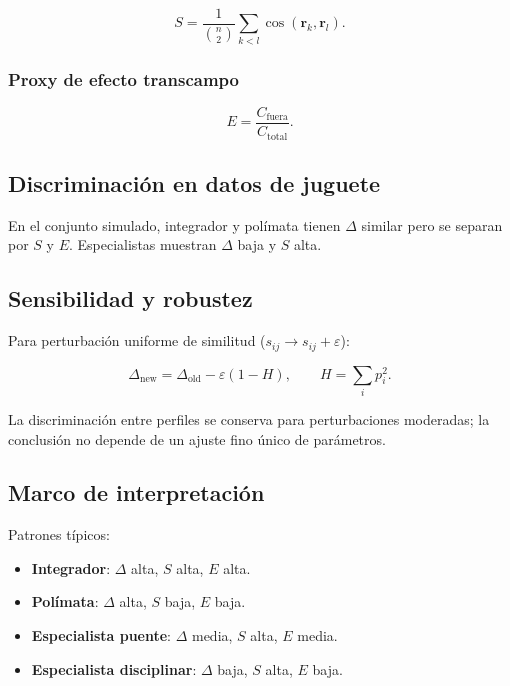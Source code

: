 \documentclass[
]{article}
\providecommand{\tightlist}{%
  \setlength{\itemsep}{0pt}\setlength{\parskip}{0pt}}
\begin{document}
\[S = \frac{1}{\binom{n}{2}}\sum_{k<l}\cos(\mathbf r_k,\mathbf r_l).\]

\hypertarget{proxy-de-efecto-transcampo}{%
\subsubsection{Proxy de efecto
transcampo}\label{proxy-de-efecto-transcampo}}

\[E = \frac{C_{\text{fuera}}}{C_{\text{total}}}.\]

\hypertarget{discriminaciuxf3n-en-datos-de-juguete}{%
\subsection{Discriminación en datos de
juguete}\label{discriminaciuxf3n-en-datos-de-juguete}}

En el conjunto simulado, integrador y polímata tienen \(\Delta\) similar
pero se separan por \(S\) y \(E\). Especialistas muestran \(\Delta\)
baja y \(S\) alta.

\hypertarget{sensibilidad-y-robustez}{%
\subsection{Sensibilidad y robustez}\label{sensibilidad-y-robustez}}

Para perturbación uniforme de similitud
(\(s_{ij}\to s_{ij}+\varepsilon\)):

\[\Delta_{\text{new}} = \Delta_{\text{old}} - \varepsilon(1-H), \qquad H=\sum_i p_i^2.\]

La discriminación entre perfiles se conserva para perturbaciones
moderadas; la conclusión no depende de un ajuste fino único de
parámetros.

\hypertarget{marco-de-interpretaciuxf3n}{%
\subsection{Marco de interpretación}\label{marco-de-interpretaciuxf3n}}

Patrones típicos:

\begin{itemize}
\tightlist
\item
  \textbf{Integrador}: \(\Delta\) alta, \(S\) alta, \(E\) alta.
\item
  \textbf{Polímata}: \(\Delta\) alta, \(S\) baja, \(E\) baja.
\item
  \textbf{Especialista puente}: \(\Delta\) media, \(S\) alta, \(E\)
  media.
\item
  \textbf{Especialista disciplinar}: \(\Delta\) baja, \(S\) alta, \(E\)
  baja.
\end{itemize}
\end{document}
